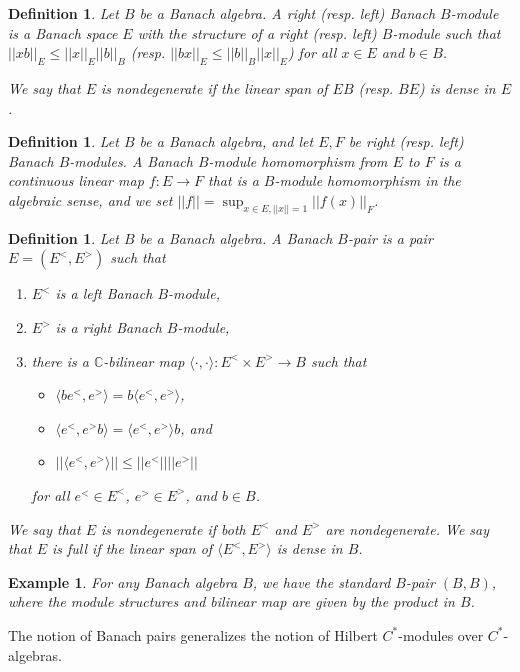 \documentclass[a4,11pt]{amsart}
\newtheorem{ex}[thm]{Example}
\newtheorem{defn}[thm]{Definition}
\theoremstyle{remark}
\begin{document}
\begin{defn}
Let $B$ be a Banach algebra. A right (resp. left) Banach $B$-module is a Banach space $E$ with the structure of a right (resp. left) $B$-module such that $||xb||_E\leq||x||_E ||b||_B$ (resp. $||bx||_E\leq||b||_B||x||_E$) for all $x\in E$ and $b\in B$.

We say that $E$ is nondegenerate if the linear span of $EB$ (resp. $BE$) is dense in $E$. 
\end{defn}

\begin{defn}
Let $B$ be a Banach algebra, and let $E,F$ be right (resp. left) Banach $B$-modules.
A Banach $B$-module homomorphism from $E$ to $F$ is a continuous linear map $f:E\rightarrow F$ that is a $B$-module homomorphism in the algebraic sense, and we set $||f||=\sup_{x\in E,||x||=1}||f(x)||_F$.
\end{defn}

\begin{defn}
Let $B$ be a Banach algebra. A Banach $B$-pair is a pair $E=(E^<,E^>)$ such that
\begin{enumerate}
\item $E^<$ is a left Banach $B$-module,
\item $E^>$ is a right Banach $B$-module,
\item there is a $\mathbb{C}$-bilinear map $\langle\cdot,\cdot\rangle:E^<\times E^>\rightarrow B$ such that 
\begin{itemize}
\item $\langle be^<,e^> \rangle=b\langle e^<,e^> \rangle$,
\item $\langle e^<,e^>b \rangle=\langle e^<,e^> \rangle b$, and
\item $||\langle e^<,e^> \rangle||\leq||e^<|| ||e^>||$
\end{itemize}
for all $e^<\in E^<$, $e^>\in E^>$, and $b\in B$.
\end{enumerate}
We say that $E$ is nondegenerate if both $E^<$ and $E^>$ are nondegenerate. We say that $E$ is full if the linear span of $\langle E^<,E^> \rangle$ is dense in $B$.
\end{defn}

\begin{ex}
For any Banach algebra $B$, we have the standard $B$-pair $(B,B)$, where the module structures and bilinear map are given by the product in $B$.
\end{ex}

The notion of Banach pairs generalizes the notion of Hilbert $C^*$-modules over $C^*$-algebras.
\end{document}
